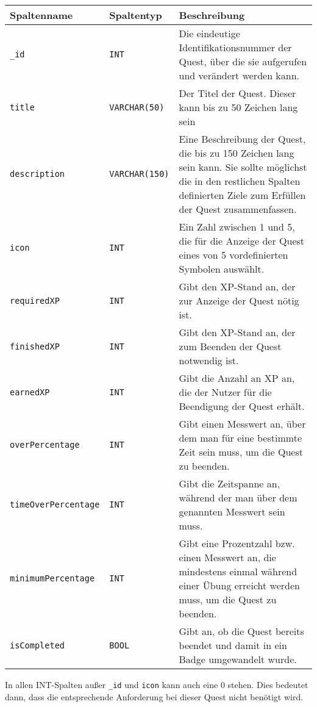  \begin{longtabu} to \linewidth {|l|l|X|}
	\hline
	\textbf{Spaltenname} & \textbf{Spaltentyp} & \textbf{Beschreibung} \\[0.3em] \hline \endhead
	\texttt{\_id} & \texttt{INT} & Die eindeutige Identifikationsnummer der Quest, über die sie aufgerufen und verändert werden kann. \\[0.5em] \hline	
	\texttt{title} & \texttt{VARCHAR(50)} & Der Titel der Quest. Dieser kann bis zu 50 Zeichen lang sein \\[0.5em] \hline
	\texttt{description} & \texttt{VARCHAR(150)} & Eine Beschreibung der Quest, die bis zu 150 Zeichen lang sein kann. Sie sollte möglichst die in den restlichen Spalten definierten Ziele zum Erfüllen der Quest zusammenfassen.  \\[0.5em] \hline
	\texttt{icon} & \texttt{INT} & Ein Zahl zwischen 1 und 5, die für die Anzeige der Quest eines von 5 vordefinierten Symbolen auswählt. \\[0.5em] \hline
	\texttt{requiredXP} & \texttt{INT} & Gibt den XP-Stand an, der zur Anzeige der Quest nötig ist. \\[0.5em] \hline
	\texttt{finishedXP} & \texttt{INT} & Gibt den XP-Stand an, der zum Beenden der Quest notwendig ist. \\[0.5em] \hline
	\texttt{earnedXP} & \texttt{INT} & Gibt die Anzahl an XP an, die der Nutzer für die Beendigung der Quest erhält. \\[0.5em] \hline
	\texttt{overPercentage} & \texttt{INT} & Gibt einen Messwert an, über dem man für eine bestimmte Zeit sein muss, um die Quest zu beenden. \\[0.5em] \hline
	\texttt{timeOverPercentage} & \texttt{INT} & Gibt die Zeitspanne an, während der man über dem genannten Messwert sein muss. \\[0.5em] \hline
	\texttt{minimumPercentage} & \texttt{INT} & Gibt eine Prozentzahl bzw. einen Messwert an, die mindestens einmal während einer Übung erreicht werden muss, um die Quest zu beenden. \\[0.5em] \hline
	\texttt{isCompleted} & \texttt{BOOL} & Gibt an, ob die Quest bereits beendet und damit in ein Badge umgewandelt wurde. \\[0.5em] \hline
\end{longtabu}
In allen INT-Spalten außer \texttt{\_id} und \texttt{icon} kann auch eine $0$ stehen. Dies bedeutet dann, dass die entsprechende Anforderung bei dieser Quest nicht benötigt wird. \\ \\
